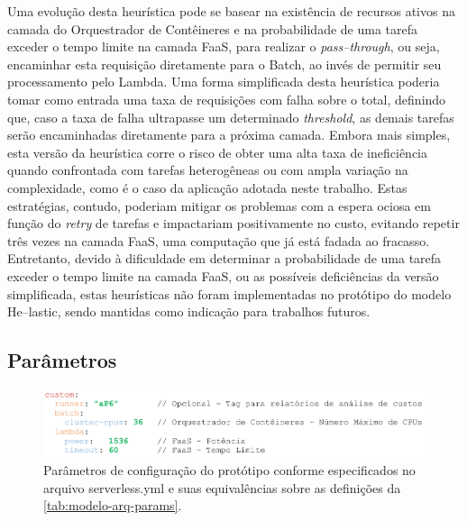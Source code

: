 \documentclass[english,brazilian]{UNISINOSmonografia} %
\begin{document}
Uma evolução desta heurística pode se basear na existência de recursos ativos na camada do Orquestrador de Contêineres e na probabilidade de uma tarefa exceder o tempo limite na camada FaaS, para realizar o \textit{pass--through}, ou seja, encaminhar esta requisição diretamente para o Batch, ao invés de permitir seu processamento pelo Lambda.
%
Uma forma simplificada desta heurística poderia tomar como entrada uma taxa de requisições com falha sobre o total, definindo que, caso a taxa de falha ultrapasse um determinado \textit{threshold}, as demais tarefas serão encaminhadas diretamente para a próxima camada.
%
Embora mais simples, esta versão da heurística corre o risco de obter uma alta taxa de ineficiência quando confrontada com tarefas heterogêneas ou com ampla variação na complexidade, como é o caso da aplicação adotada neste trabalho.
%
Estas estratégias, contudo, poderiam mitigar os problemas com a espera ociosa em função do \textit{retry} de tarefas e impactariam positivamente no custo, evitando repetir três vezes na camada FaaS, uma computação que já está fadada ao fracasso.
%
Entretanto, devido à dificuldade em determinar a probabilidade de uma tarefa exceder o tempo limite na camada FaaS, ou as possíveis deficiências da versão simplificada, estas heurísticas não foram implementadas no protótipo do modelo \textsf{He}--lastic, sendo mantidas como indicação para trabalhos futuros.




\subsection{Parâmetros}


\begin{figure}[b]
	\centering%
	\begin{minipage}{\textwidth}
		\caption{Parâmetros de configuração do protótipo conforme especificados no arquivo serverless.yml e suas equivalências sobre as definições da \autoref{tab:modelo-arq-params}.}
		\label{fig:metodologia-parametros-yaml}
		\vspace{1ex}
		\includegraphics[width=\textwidth]{metodologia-parametros-yaml}
	\end{minipage}
\end{figure}
\end{document}
